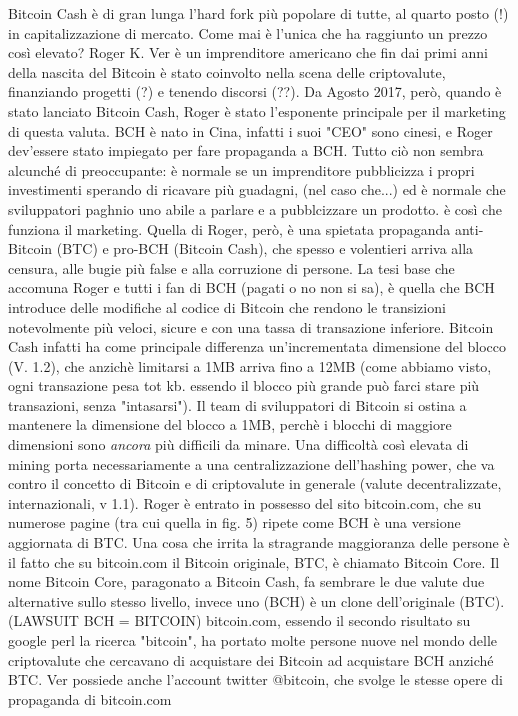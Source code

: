 \documentclass {article}
\begin{document}
{Bitcoin Cash è di gran lunga l'hard fork più popolare di tutte, al quarto posto (!) in capitalizzazione di mercato. Come mai è l'unica che ha raggiunto un prezzo così elevato?
Roger K. Ver è un imprenditore americano che fin dai primi anni della nascita del Bitcoin è stato coinvolto nella scena delle criptovalute, finanziando progetti (?) e tenendo discorsi (??).
Da Agosto 2017, però, quando è stato lanciato Bitcoin Cash, Roger è stato l'esponente principale per il marketing di questa valuta. BCH è nato in Cina, infatti i suoi "CEO" sono cinesi, e Roger dev'essere stato impiegato per fare propaganda a BCH.
Tutto ciò non sembra alcunché di preoccupante: è normale se un imprenditore pubblicizza i propri investimenti sperando di ricavare più guadagni, (nel caso che...) ed è normale che sviluppatori paghnio uno abile a parlare e a pubblcizzare un prodotto.
è così che funziona il marketing.
Quella di Roger, però, è una spietata propaganda anti-Bitcoin (BTC) e pro-BCH (Bitcoin Cash), che spesso e volentieri arriva alla censura, alle bugie più false e alla corruzione di persone.
La tesi base che accomuna Roger e tutti i fan di BCH (pagati o no non si sa), è quella che BCH introduce delle modifiche al codice di Bitcoin che rendono le transizioni notevolmente più veloci, sicure e con una tassa di transazione inferiore. Bitcoin Cash infatti ha come principale differenza un'incrementata dimensione del blocco (V. 1.2), che anzichè limitarsi a 1MB arriva fino a 12MB (come abbiamo visto, ogni transazione pesa tot kb. essendo il blocco più grande può farci stare più transazioni, senza "intasarsi").
Il team di sviluppatori di Bitcoin si ostina a mantenere la dimensione del blocco a 1MB, perchè i blocchi di maggiore dimensioni sono \emph{ancora} più difficili da minare.
Una difficoltà così elevata di mining porta necessariamente a una centralizzazione dell'hashing power, che va contro il concetto di Bitcoin e di criptovalute in generale (valute decentralizzate, internazionali, v 1.1).
Roger è entrato in possesso del sito bitcoin.com, che su numerose pagine (tra cui quella in fig. 5) ripete come BCH è una versione aggiornata di BTC. Una cosa che irrita la stragrande maggioranza delle persone è il fatto che su bitcoin.com il Bitcoin originale, BTC, è chiamato Bitcoin Core.
Il nome Bitcoin Core, paragonato a Bitcoin Cash, fa sembrare le due valute due alternative sullo stesso livello, invece uno (BCH) è un clone dell'originale (BTC). (LAWSUIT BCH = BITCOIN)
bitcoin.com, essendo il secondo risultato su google perl la ricerca "bitcoin", ha portato molte persone nuove nel mondo delle criptovalute che cercavano di acquistare dei Bitcoin ad acquistare BCH anziché BTC.
Ver possiede anche l'account twitter @bitcoin, che svolge le stesse opere di propaganda di bitcoin.com


}
\end{document}
